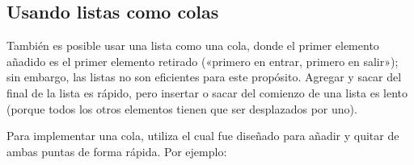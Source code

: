 \documentclass[a4,10pt,spanish]{sphinxmanual}
\begin{document}
\subsection{Usando listas como colas}
\label{\detokenize{tutorial/datastructures:using-lists-as-queues}}\label{\detokenize{tutorial/datastructures:tut-lists-as-queues}}
\sphinxAtStartPar
También es posible usar una lista como una cola, donde el primer elemento añadido es el primer elemento retirado («primero en entrar, primero en salir»); sin embargo, las listas no son eficientes para este propósito. Agregar y sacar del final de la lista es rápido, pero insertar o sacar del comienzo de una lista es lento (porque todos los otros elementos tienen que ser desplazados por uno).

\sphinxAtStartPar
Para implementar una cola, utiliza  el cual fue diseñado para añadir y quitar de ambas puntas de forma rápida. Por ejemplo:

\begin{sphinxVerbatim}[commandchars=\\\{\}]
   
  \PYG{p}{[}  \PYG{p}{]}
           
          
                 
                 
                           
\end{sphinxVerbatim}
\end{document}
